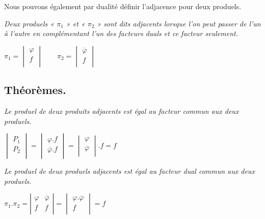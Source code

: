 \bigskip 




Nous pouvons également par dualité définir l'adjacence pour deux produels. 

\textsl{Deux produels « ${\pi}_1$ »  et  « ${\pi}_2$ »  sont dits adjacents lorsque l'on peut passer de l'un à l'autre en complémentant l'un des facteurs duals et ce facteur seulement.  } 

\bigskip 

\centerline{ ${\pi}_1  = \begin{vmatrix} \varphi \\  f \\ \end{vmatrix} \qquad 
                                        {\pi}_2 = \begin{vmatrix} \overline{\varphi}  \\  f \\ \end{vmatrix}  $ }
                    
\subsection{Théorèmes. } \textsl{ Le produel de deux produits adjacents est égal au facteur commun aux deux produels}. 

\bigskip 

\centerline{ $ \begin{vmatrix}
P_1\\P_2\\
\end{vmatrix} 
 = \begin{vmatrix}
        \varphi . f \\ \overline{\varphi} . f \\
    \end{vmatrix} 
       = \begin{vmatrix}
            \varphi \\ \overline{\varphi} \\ 
        \end{vmatrix} .f = f 
  $ }

\bigskip 

 \textsl{ Le produel de deux produels adjacents est égal au facteur dual commun  aux deux produels}. 
 
 \bigskip 
 
 \centerline{$
 {\pi}_1 . {\pi}_2 = \left| \begin{array}{c|c} 
                                    \varphi & \overline{\varphi}  \\
                                    f & f \\
                       \end{array}  \right|
       = \begin{vmatrix}
               \varphi . \overline{\varphi} \\ f   \\
       \end{vmatrix} = f 
 $}
 
